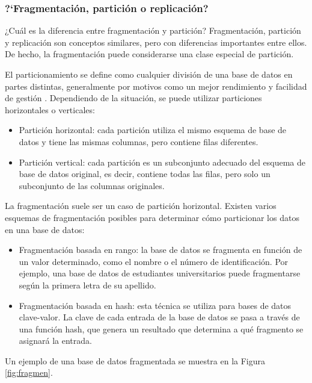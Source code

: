  
\subsubsection{?`Fragmentación, partición o replicación?}
 
  ¿Cuál es la diferencia entre fragmentación y partición? Fragmentación, partición y replicación son conceptos similares, pero con diferencias importantes entre ellos. De hecho, la fragmentación puede considerarse una clase especial de partición.
 
 El particionamiento se define como cualquier división de una base de datos en partes distintas, generalmente por motivos como un mejor rendimiento y facilidad de gestión \cite{Ozsu2020}  \cite{Harrison2016}. Dependiendo de la situación, se puede utilizar particiones horizontales o verticales:
 
 \begin{itemize}
 	\item   Partición horizontal: cada partición utiliza el mismo esquema de base de datos y tiene las mismas columnas, pero contiene filas diferentes.
 	\item Partición vertical: cada partición es un subconjunto adecuado del esquema de base de datos original, es decir, contiene todas las filas, pero solo un subconjunto de las columnas originales.
 	
 \end{itemize}

 La fragmentación suele ser un caso de partición horizontal. Existen varios esquemas de fragmentación posibles para determinar cómo particionar los datos en una base de datos:
 \begin{itemize}
 	\item Fragmentación basada en rango: la base de datos se fragmenta en función de un valor determinado, como el nombre o el número de identificación. Por ejemplo, una base de datos de estudiantes universitarios puede fragmentarse según la primera letra de su apellido.
 	\item  Fragmentación basada en hash: esta técnica se utiliza para bases de datos clave-valor. La clave de cada entrada de la base de datos se pasa a través de una función hash, que genera un resultado que determina a qué fragmento se asignará la entrada.
 \end{itemize}
 
Un ejemplo de una base de datos fragmentada se muestra en la Figura \ref{fig:fragmen}.
 
